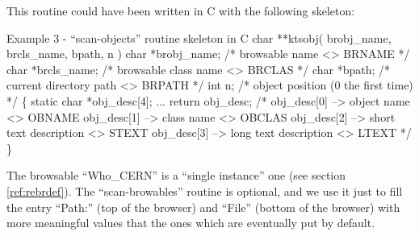 This routine could have been written in C with the following skeleton:
\begin{XMPt} {Example 3 - ``scan-objects'' routine skeleton in C}
char **ktsobj( brobj_name, brcls_name, bpath, n )
     char *brobj_name;  /* browsable name <> BRNAME */
     char *brcls_name;  /* browsable class name <> BRCLAS */
     char *bpath;       /* current directory path <> BRPATH */
     int n;             /* object position (0 the first time) */
\{
  static char     *obj_desc[4];\vspace{.5\baselineskip}
    ...\vspace{.5\baselineskip}
  return obj_desc;   /* obj_desc[0] --> object name <> OBNAME
                        obj_desc[1] --> class name <> OBCLAS
                        obj_desc[2] --> short text description <> STEXT
                        obj_desc[3] --> long text description <> LTEXT */
\}
\end{XMPt}

The browsable ``Who\_CERN'' is a ``single instance'' one (see section
\ref{ref:rebrdef}). The ``scan-browables'' routine is optional, and we
use it just to fill the entry ``Path:'' (top of the browser) and 
``File'' (bottom of the browser) with more meaningful values that
the ones which are eventually put by default.
 

